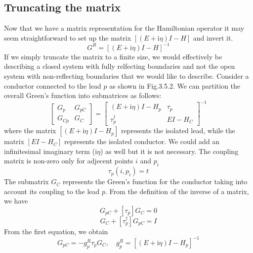 \documentclass[11pt,a4paper]{book}
\theoremstyle{plain}
\theoremstyle{definition}
\theoremstyle{remark}
\newcommand{\ii}{\mathrm{i}}                      %
\begin{document}
\subsection{Truncating the matrix}
Now that we have a matrix representation for the Hamiltonian operator it may seem straightforward to set up the matrix $[(E+\ii \eta)I - H]$ and invert it.
\begin{equation}
    G^R = \left[(E+\ii \eta)I - H \right]^{-1}
\end{equation}
If we simply truncate the matrix to a finite size, we would effectively be describing a closed system with fully relfecting boundaries and not the open system with non-reflecting boundaries that we would like to describe. Consider a conductor connected to the lead $p$ as shown in Fig.3.5.2. We can partition the overall Green's function into submatrices as follows:
\begin{equation}
    \begin{bmatrix}
        G_p & G_{pC} \\
        G_{Cp} & G_C
    \end{bmatrix}
    =
    \begin{bmatrix}
        (E+\ii \eta)I - H_p & \tau_{p} \\
        \tau_{p}^\dagger & EI - H_C
    \end{bmatrix}^{-1}
\end{equation}
where the matrix $[(E + \ii \eta)I - H_p]$ represents the isolated lead, while the matrix $[EI - H_C]$ represents the isolated conductor. We could add an infinitesimal imaginary term ($\ii \eta$) as well but it is not necessary. The coupling matrix is non-zero only for adjecent points $i$ and $p_i$
\begin{equation}
    \tau_p(i,p_i) = t
\end{equation}
The submatrix $G_C$ represents the Green's function for the conductor taking into account its coupling to the lead $p$. From the definition of the inverse of a matrix, we have
\begin{equation}
    [(E+\ii \eta)I - H_p]G_{pC} + [\tau_p] G_C = 0
\end{equation}
\begin{equation}
    [EI - H_C] G_C + [\tau_p^\dagger] G_{pC} = I
\end{equation}
From the first equation, we obtain
\begin{equation}
    G_{pC} = -g^R_p \tau_p G_C, \quad g^R_p = \left[(E+\ii \eta)I - H_p \right]^{-1}
\end{equation}
\end{document}
